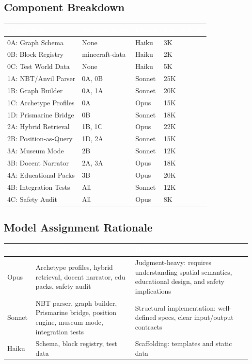 \documentclass[11pt,letterpaper]{article}
\newcommand{\tableheader}[1]{\textbf{\sffamily\textcolor{white}{#1}}}
\begin{document}
\subsection{Component Breakdown}

\begin{center}
\begin{tabularx}{\textwidth}{L{3cm}L{2cm}C{1.5cm}C{2cm}}
\toprule
{}
\tableheader{Component} & \tableheader{Dependencies} & \tableheader{Model} & \tableheader{Est. Tokens} \\
\midrule
0A: Graph Schema & None & Haiku & 3K \\
0B: Block Registry & minecraft-data & Haiku & 2K \\
0C: Test World Data & None & Haiku & 5K \\
1A: NBT/Anvil Parser & 0A, 0B & Sonnet & 25K \\
1B: Graph Builder & 0A, 1A & Sonnet & 20K \\
1C: Archetype Profiles & 0A & Opus & 15K \\
1D: Prismarine Bridge & 0B & Sonnet & 18K \\
2A: Hybrid Retrieval & 1B, 1C & Opus & 22K \\
2B: Position-as-Query & 1D, 2A & Sonnet & 15K \\
3A: Museum Mode & 2B & Sonnet & 12K \\
3B: Docent Narrator & 2A, 3A & Opus & 18K \\
4A: Educational Packs & 3B & Opus & 20K \\
4B: Integration Tests & All & Sonnet & 12K \\
4C: Safety Audit & All & Opus & 8K \\
\bottomrule
\end{tabularx}
\end{center}

\subsection{Model Assignment Rationale}

\begin{center}
\begin{tabularx}{\textwidth}{C{1.5cm}XL{3.5cm}}
\toprule
{}
\tableheader{Model} & \tableheader{Assigned To} & \tableheader{Rationale} \\
\midrule
Opus & Archetype profiles, hybrid retrieval, docent narrator, edu packs, safety audit & Judgment-heavy: requires understanding spatial semantics, educational design, and safety implications \\
Sonnet & NBT parser, graph builder, Prismarine bridge, position engine, museum mode, integration tests & Structural implementation: well-defined specs, clear input/output contracts \\
Haiku & Schema, block registry, test data & Scaffolding: templates and static data \\
\bottomrule
\end{tabularx}
\end{center}
\end{document}
